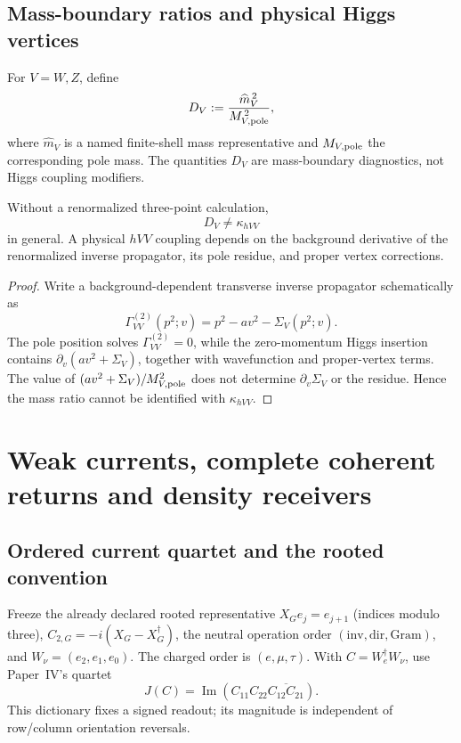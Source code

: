 \documentclass[12pt,a4paper]{article}
\begin{document}
\subsection{Mass-boundary ratios and physical Higgs vertices}
\label{p7v2:sec:higgs-vertices}

\begin{definition}
\label{p7v2:def:mass-boundary-diagnostics}
For \(V=W,Z\), define
\begin{equation}
\label{p7v2:eq:mass-boundary-ratio}
 D_V
 :=
 \frac{\widehat m_V^{\,2}}{M_{V,\rm pole}^{\,2}},
\end{equation}
where \(\widehat m_V\) is a named finite-shell mass representative and
\(M_{V,\rm pole}\) the corresponding pole mass.  The quantities \(D_V\) are
mass-boundary diagnostics, not Higgs coupling modifiers.
\end{definition}

\begin{proposition}
\label{p7v2:prop:mass-ratio-not-kappa}
Without a renormalized three-point calculation,
\[
 D_V\neq\kappa_{hVV}
\]
in general.  A physical \(hVV\) coupling depends on the background derivative
of the renormalized inverse propagator, its pole residue, and proper vertex
corrections.
\end{proposition}

\begin{proof}
Write a background-dependent transverse inverse propagator schematically as
\[
 \Gamma_{VV}^{(2)}(p^2;v)
 =
 p^2-a v^2-\Sigma_V(p^2;v).
\]
The pole position solves \(\Gamma_{VV}^{(2)}=0\), while the zero-momentum Higgs
insertion contains
\(\partial_v(av^2+\Sigma_V)\), together with wavefunction and proper-vertex
terms.  The value of
\((av^2+\Sigma_V)/M_{V,\rm pole}^2\) does not determine
\(\partial_v\Sigma_V\) or the residue.  Hence the mass ratio cannot be
identified with \(\kappa_{hVV}\).
\end{proof}


\section{Weak currents, complete coherent returns and density receivers}
\label{p5c:sec:organized-weak}
\subsection{Ordered current quartet and the rooted convention}
\label{p5c:sec:v2167-ordered-current-convention}
Freeze the already declared rooted representative
$X_Ge_j=e_{j+1}$ (indices modulo three),
$C_{2,G}=-i(X_G-X_G^\dagger)$, the neutral operation order
$(\mathrm{inv},\mathrm{dir},\mathrm{Gram})$, and
$W_\nu=(e_2,e_1,e_0)$. The charged order is $(e,\mu,\tau)$.
With $C=W_e^\dagger W_\nu$, use Paper~IV's quartet
\[
 J(C)=\operatorname{Im}(C_{11}C_{22}\overline{C_{12}C_{21}}).
\]
This dictionary fixes a signed readout; its magnitude is independent of
row/column orientation reversals.
\end{document}
